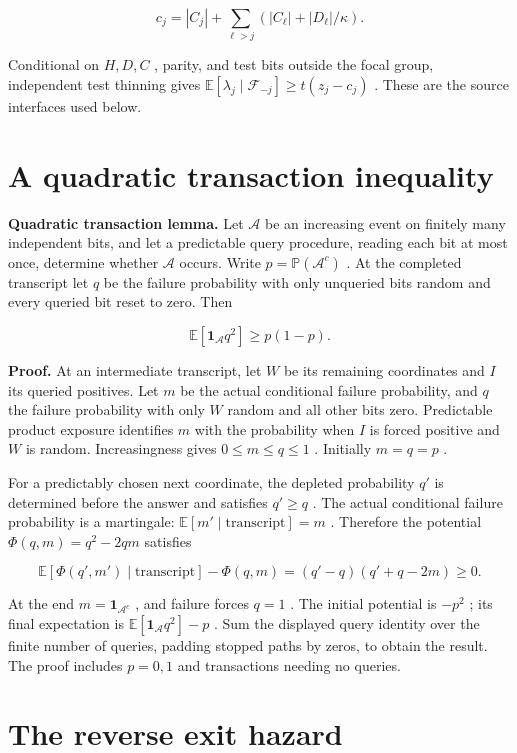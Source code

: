 \documentclass[11pt]{article}
\begin{document}
\[c_j=|C_j|+\sum_{\ell>j}(|C_\ell|+|D_\ell|/\kappa).\]

Conditional on \(H,D,C\) , parity, and test bits outside the focal group, independent test thinning gives \(\mathbb{E}[\lambda_j\mid\mathcal F_{-j}] \ge t(z_j-c_j)\) . These are the source interfaces used below.

\section{A quadratic transaction inequality}\label{a-quadratic-transaction-inequality}

\textbf{Quadratic transaction lemma.} Let \(\mathcal A\) be an increasing event on finitely many independent bits, and let a predictable query procedure, reading each bit at most once, determine whether \(\mathcal A\) occurs. Write \(p=\mathbb{P}(\mathcal A^c)\) . At the completed transcript let \(q\) be the failure probability with only unqueried bits random and every queried bit reset to zero. Then

\[\mathbb{E}[\mathbf 1_{\mathcal A}q^2]\ge p(1-p).\]

\textbf{Proof.} At an intermediate transcript, let \(W\) be its remaining coordinates and \(I\) its queried positives. Let \(m\) be the actual conditional failure probability, and \(q\) the failure probability with only \(W\) random and all other bits zero. Predictable product exposure identifies \(m\) with the probability when \(I\) is forced positive and \(W\) is random. Increasingness gives \(0\le m\le q\le1\) . Initially \(m=q=p\) .

For a predictably chosen next coordinate, the depleted probability \(q'\) is determined before the answer and satisfies \(q'\ge q\) . The actual conditional failure probability is a martingale: \(\mathbb{E}[m'\mid\text{transcript}]=m\) . Therefore the potential \(\Phi(q,m)=q^2-2qm\) satisfies

\[\mathbb{E}[\Phi(q',m')\mid\text{transcript}]-\Phi(q,m)
 =(q'-q)(q'+q-2m)\ge0.\]

At the end \(m=\mathbf 1_{\mathcal A^c}\) , and failure forces \(q=1\) . The initial potential is \(-p^2\) ; its final expectation is \(\mathbb{E}[\mathbf 1_{\mathcal A}q^2]-p\) . Sum the displayed query identity over the finite number of queries, padding stopped paths by zeros, to obtain the result. The proof includes \(p=0,1\) and transactions needing no queries.

\section{The reverse exit hazard}\label{the-reverse-exit-hazard}
\end{document}
